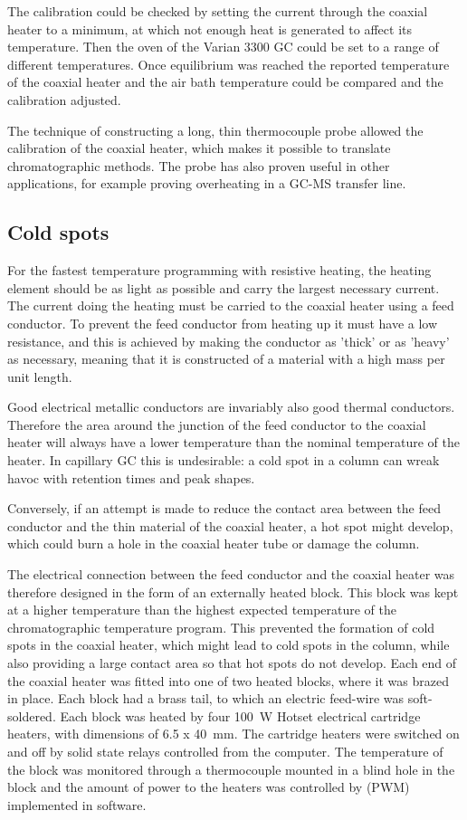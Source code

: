 The calibration could be checked by setting the current through the coaxial
heater to a minimum, at which not enough heat is generated to affect its
temperature. Then the oven of the Varian 3300 GC could be set to a range of
different temperatures. Once equilibrium was reached the reported temperature of
the coaxial heater and the air bath temperature could be compared and the
calibration adjusted.

The technique of constructing a long, thin thermocouple probe allowed the
calibration of the coaxial heater, which makes it possible to translate
chromatographic methods. The probe has also proven useful in other applications,
for example proving overheating in a GC-MS transfer line.

\subsection{Cold spots}
\label{sec:ColdSpots}

For the fastest temperature programming with resistive heating, the heating
element should be as light as possible and carry the largest necessary current.
The current doing the heating must be carried to the coaxial heater using a feed
conductor. To prevent the feed conductor from heating up it must have a low
resistance, and this is achieved by making the conductor as 'thick' or as
'heavy' as necessary, meaning that it is constructed of a material with a high
mass per unit length.

Good electrical metallic conductors are invariably also good thermal conductors.
Therefore the area around the junction of the feed conductor to the coaxial
heater will always have a lower temperature than the nominal temperature of the
heater. In capillary GC this is undesirable: a cold spot in a column can wreak
havoc with retention times and peak shapes.

Conversely, if an attempt is made to reduce the contact area between the feed
conductor and the thin material of the coaxial heater, a hot spot might develop,
which could burn a hole in the coaxial heater tube or damage the column.

The electrical connection between the feed conductor and the coaxial heater was
therefore designed in the form of an externally heated block. This block was
kept at a higher temperature than the highest expected temperature of the
chromatographic temperature program. This prevented the formation of cold spots
in the coaxial heater, which might lead to cold spots in the column, while also
providing a large contact area so that hot spots do not develop. Each end of the
coaxial heater was fitted into one of two heated blocks, where it was brazed in
place. Each block had a brass tail, to which an electric feed-wire was
soft-soldered. Each block was heated by four \SI{100}{\watt}
Hotset\texttrademark{} electrical cartridge heaters, with dimensions of \SI{6.5
x 40}{\milli\metre}. The cartridge heaters were switched on and off by solid
state relays controlled from the computer. The temperature of the block was
monitored through a thermocouple mounted in a blind hole in the block and the
amount of power to the heaters was controlled by  (PWM) implemented in software.
 
